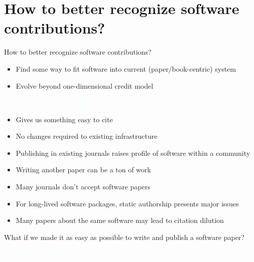 \section{How to better recognize software
contributions?}

\begin{frame}{How to better recognize software
contributions?}

\begin{itemize}
    \item Find some way to fit software into
current (paper/book-centric)
system
    \item  Evolve beyond one-dimensional
credit model
\end{itemize}

\begin{center}
    \textcolor{azure}{What if we just wrote papers about software?}
\end{center}

\begin{itemize}
    \item<only@1> Gives us something easy to cite 
    \item<only@1> No changes required to existing
infrastructure 
    \item<only@1> Publishing in existing journals raises
profile of software within a community 
%
    \item<2> Writing another paper can be a ton of
work 
    \item<2> Many journals don’t accept software
papers 
    \item<2> For long-lived software packages, static
authorship presents major issues 
    \item<2> Many papers about the same software
may lead to citation dilution 
\end{itemize}

    
\end{frame}

\begin{frame}

\begin{center}
What if we made it as easy as
possible to write and publish a
software paper?
\end{center}

\begin{center}
   \textcolor{azure}{Embracing the hack}
\end{center}

\end{frame}

